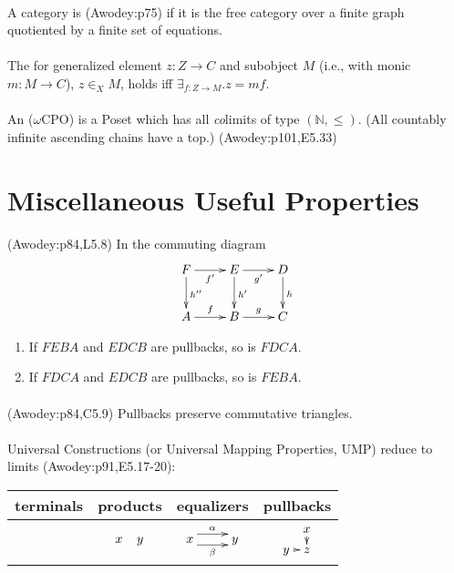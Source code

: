 \documentclass[10pt,twocolumn,letterpaper]{article}
\begin{document}
  \paragraph{}
  A category is  (Awodey:p75) if it is the free
  category over a finite graph quotiented by a finite set of equations.

  \paragraph{}
  The  for generalized element $z : Z \to C$
  and subobject $M$ (i.e., with monic $m : M \to C$), $z \in_X M$, holds iff
  $\exists_{f:Z \to M} . z = mf$.

  \paragraph{}
  An 
  ($\omega$CPO) is a Poset which has all {\em co}limits of type
  $(\mathbb{N},\le)$.  (All countably infinite ascending chains have a top.)
  (Awodey:p101,E5.33)

\section{Miscellaneous Useful Properties} %

  \paragraph{}
  (Awodey:p84,L5.8) In the commuting diagram
    \[\xymatrix{ F \ar[r]_{f'} \ar[d]^{h''} & E \ar[r]_{g'} \ar[d]^{h'} & D \ar[d]^{h} \\
       A \ar[r]^f & B \ar[r]^g & C
    }\]
    \begin{enumerate}
      \item If $FEBA$ and $EDCB$ are pullbacks, so is $FDCA$.
      \item If $FDCA$ and $EDCB$ are pullbacks, so is $FEBA$.
    \end{enumerate}

  \paragraph{}
  (Awodey:p84,C5.9) Pullbacks preserve commutative triangles.

  \paragraph{}
  Universal Constructions (or Universal Mapping Properties, UMP) reduce to
  limits (Awodey:p91,E5.17-20):
  \begin{tabular}{|c|c|c|c|}
  	\hline
      terminals & products & equalizers & pullbacks \\
  	\hline
      & $\xymatrix@C5pt{x & y}$
      & $\xymatrix{x \ar@<1ex>[r]^{\alpha} \ar@<-1ex>[r]_{\beta} & y}$
      & $\xymatrix@C5pt@R5pt{& x \ar[d] \\ y \ar[r] & z}$\\
  	\hline
  \end{tabular}
\end{document}
